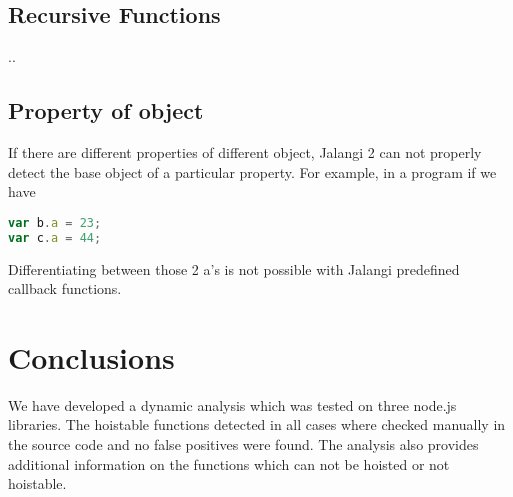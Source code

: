 \documentclass[accentcolor=tud0b,12pt,paper=a4]{tudreport}
\begin{document}
\section{Recursive Functions}
..
\section{Property of object}
If there are different properties of different object, Jalangi 2 can not properly detect the base object of a particular property. For example, in a program if we have
\begin{lstlisting}[language=JavaScript]
var b.a = 23;
var c.a = 44;
\end{lstlisting}
Differentiating between those 2 a's is not possible with Jalangi predefined callback functions.

\chapter{Conclusions}
We have developed a dynamic analysis which was tested on three node.js libraries. The hoistable functions detected in all cases where checked manually in the source code and no false positives were found. The analysis also provides additional information on the functions which can not be hoisted or not hoistable. 
\end{document}
